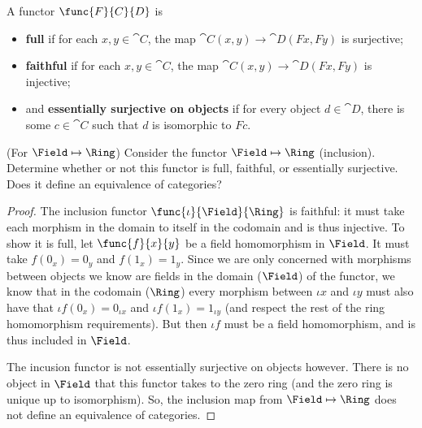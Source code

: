 \documentclass[main.tex]{subfiles}
\begin{document}
\begin{definition}
	A functor $\func{F}{C}{D}$ is
	\begin{itemize}
		\item \textbf{full} if for each $x,y\in \cat{C}$, the map
			$\cat{C}(x,y)\rightarrow\cat{D}(Fx,Fy)$ is surjective;

		\item \textbf{faithful} if for each $x,y\in \cat{C}$, the map
			$\cat{C}(x,y)\rightarrow\cat{D}(Fx,Fy)$ is injective;

		\item and \textbf{essentially surjective on objects} if for every object
			$d\in\cat{D}$, there is some $c\in\cat{C}$ such that $d$ is
			isomorphic to $Fc$.
	\end{itemize}
\end{definition}

\begin{exercise}(For $\Field\mapsto\Ring$)
	Consider the functor $\Field\mapsto\Ring$ (inclusion). Determine whether or
	not this functor is full, faithful, or essentially surjective. Does it
	define an equivalence of categories?
\end{exercise}

\begin{proof}
	The inclusion functor $\func{\iota}{\Field}{\Ring}$ is faithful: it must
	take each morphism in the domain to itself in the codomain and is thus
	injective. To show it is full, let $\func{f}{x}{y}$ be a field homomorphism
	in $\Field$. It must take $f(0_x)=0_y$ and $f(1_x)=1_y$. Since we are only
	concerned with morphisms between objects we know are fields in the domain
	($\Field$) of the functor, we know that in the codomain ($\Ring$) every
	morphism between $\iota x$ and $\iota y$ must also have that $\iota f(0_x) =
	0_{\iota x}$ and $\iota f(1_x) = 1_{\iota y}$ (and respect the rest of the
	ring homomorphism requirements). But then $\iota f$ must be a field
	homomorphism, and is thus included in $\Field$.
	
	The incusion functor is not essentially surjective on objects however. There
	is no object in $\Field$ that this functor takes to the zero ring (and the
	zero ring is unique up to isomorphism). So, the inclusion map from
	$\Field\mapsto\Ring$ does not define an equivalence of categories.
\end{proof}
\end{document}
